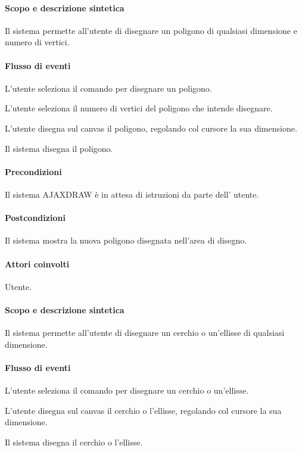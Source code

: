 \paragraph{Scopo e descrizione sintetica} 
Il sistema permette all'utente di disegnare un poligono di qualsiasi dimensione e numero di vertici.
\paragraph{Flusso di eventi}
\begin{elenconumerato}[\textbf{}]{\subsubsecindent}
\item L'utente seleziona il comando per disegnare un poligono.
\item L'utente seleziona il numero di vertici del poligono che intende disegnare.
\item L'utente disegna sul canvas il poligono, regolando col cursore la sua dimensione.
\item Il sistema disegna il poligono.
\end{elenconumerato}
\paragraph{Precondizioni} Il sistema AJAXDRAW \`e in attesa di istruzioni da parte dell' utente.
\paragraph{Postcondizioni} Il sistema mostra la nuova poligono disegnata nell'area di disegno.

\paragraph{Attori coinvolti} Utente.
\paragraph{Scopo e descrizione sintetica} 
Il sistema permette all'utente di disegnare un cerchio o un'ellisse di qualsiasi dimensione.
\paragraph{Flusso di eventi}
\begin{elenconumerato}[\textbf{}]{\subsubsecindent}
\item L'utente seleziona il comando per disegnare un cerchio o un'ellisse.
\item L'utente disegna sul canvas il cerchio o l'ellisse, regolando col cursore la sua dimensione.
\item Il sistema disegna il cerchio o l'ellisse.
\end{elenconumerato}
